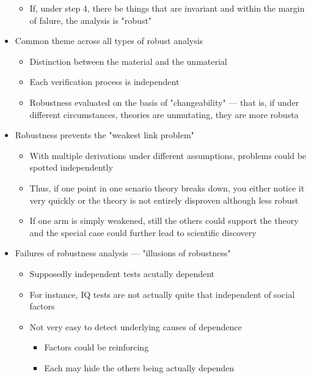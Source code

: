 \documentclass[letterpaper]{article}
\begin{document}
\begin{itemize}
\begin{itemize}
\item If, under step 4, there be things that are invariant and within the
margin of falure, the analysis is "robust"
\end{itemize}

\item Common theme across all types of robust analysis

\begin{itemize}
\item Distinction between the material and the unmaterial
\item Each verification process is independent
\item Robustness evaluated on the basis of "changeability" --- that is, if
under different circumstances, theories are unmutating, they are
more robusta
\end{itemize}

\item Robustness prevents the "weakest link problem"

\begin{itemize}
\item With multiple derivations under different assumptions, problems
could be spotted independently
\item Thus, if one point in one senario theory breaks down, you either
notice it very quickly or the theory is not entirely disproven
although less robust
\item If one arm is simply weakened, still the others could support the
theory and the special case could further lead to scientific
discovery
\end{itemize}

\item Failures of robustness analysis --- "illusions of robustness"

\begin{itemize}
\item Supposedly independent tests acutally dependent
\item For instance, IQ tests are not actually quite that independent of
social factors
\item Not very easy to detect underlying causes of dependence

\begin{itemize}
\item Factors could be reinforcing
\item Each may hide the others being actually dependen
\end{itemize}
\end{itemize}
\end{itemize}
\end{document}
